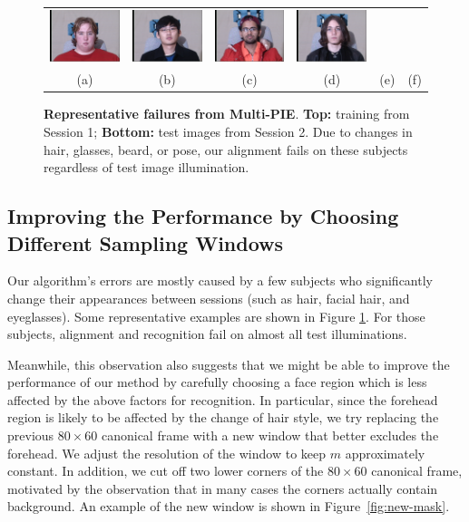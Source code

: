 \documentclass[10pt,journal,letterpaper,compsoc]{IEEEtran} %
\begin{document}
\begin{figure}
{\begin{tabular}{cccccc}
\includegraphics[width=0.9in,clip=true]{figures_pami/multipie_failed/196_02_01_051_08.png}  &
\includegraphics[width=0.9in,clip=true]{figures_pami/multipie_failed/130_02_01_051_08.png}  &
\includegraphics[width=0.9in,clip=true]{figures_pami/multipie_failed/163_02_01_051_08.png}  &
\includegraphics[width=0.9in,clip=true]{figures_pami/multipie_failed/175_02_01_051_08.png} \vspace{0mm} \\
(a) & (b) & (c) & (d) & (e) & (f) \vspace{0mm}
\end{tabular}
}
\caption{{\bf Representative failures from Multi-PIE}. {\bf Top:} training from Session 1; {\bf Bottom:} test images from Session 2. Due to changes in hair, glasses, beard, or pose, our alignment fails on these subjects regardless of test image illumination.}
\label{fig:failed-examples}
\vspace{0mm}
\end{figure}

\subsection{Improving the Performance by Choosing Different Sampling Windows}
Our algorithm's errors are mostly caused by a few subjects who
significantly change their appearances between sessions (such
as hair, facial hair, and eyeglasses). Some representative
examples are shown in Figure \ref{fig:failed-examples}. For those subjects, alignment and recognition fail on
almost all test illuminations.

Meanwhile, this observation also suggests that we might be able
to improve the performance of our method by carefully choosing
a face region which is less affected by the above factors for
recognition. In particular, since the forehead region is likely
to be affected by the change of hair style, we try replacing
the previous $80 \times 60$ canonical frame with a new
window that better excludes the forehead. We adjust the
resolution of the window to keep $m$ approximately constant. In addition,
we cut off two lower corners of the $80 \times 60$ canonical frame, motivated by
the observation that in many cases the corners
actually contain background. An example of the new window
is shown in Figure~\ref{fig:new-mask}.
\end{document}
